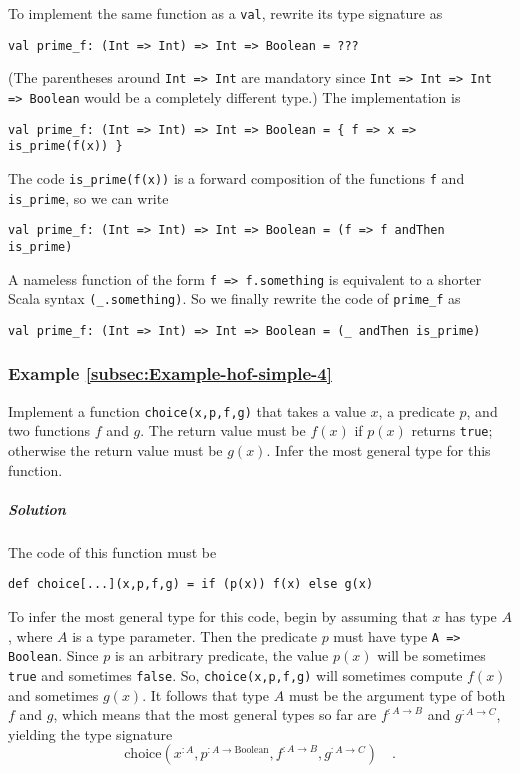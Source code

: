 To implement the same function as a \lstinline!val!, rewrite its
type signature as
\begin{lstlisting}
val prime_f: (Int => Int) => Int => Boolean = ???
\end{lstlisting}
(The parentheses around \lstinline!Int => Int! are mandatory since
\lstinline!Int => Int => Int => Boolean! would be a completely different
type.) The implementation is
\begin{lstlisting}
val prime_f: (Int => Int) => Int => Boolean = { f => x => is_prime(f(x)) }
\end{lstlisting}
The code \lstinline!is_prime(f(x))! is a forward composition of the
functions \lstinline!f! and \lstinline!is_prime!, so we can write
\begin{lstlisting}
val prime_f: (Int => Int) => Int => Boolean = (f => f andThen is_prime)
\end{lstlisting}
A nameless function of the form \lstinline!f => f.something! is equivalent
to a shorter Scala syntax \lstinline!(_.something)!. So we finally
rewrite the code of \lstinline!prime_f! as
\begin{lstlisting}
val prime_f: (Int => Int) => Int => Boolean = (_ andThen is_prime)
\end{lstlisting}


\subsubsection{Example \label{subsec:Example-hof-simple-4}\ref{subsec:Example-hof-simple-4}}

Implement a function \lstinline!choice(x,p,f,g)! that takes a value
$x$, a predicate $p$, and two functions $f$ and $g$. The return
value must be $f(x)$ if $p(x)$ returns \lstinline!true!; otherwise
the return value must be $g(x)$. Infer the most general type for
this function.

\subparagraph{Solution}

The code of this function must be
\begin{lstlisting}
def choice[...](x,p,f,g) = if (p(x)) f(x) else g(x)
\end{lstlisting}
To infer the most general type for this code, begin by assuming that
$x$ has type $A$, where $A$ is a type parameter. Then the predicate
$p$ must have type \lstinline!A => Boolean!. Since $p$ is an arbitrary
predicate, the value $p(x)$ will be sometimes \lstinline!true! and
sometimes \lstinline!false!. So, \lstinline!choice(x,p,f,g)! will
sometimes compute $f(x)$ and sometimes $g(x)$. It follows that type
$A$ must be the argument type of both $f$ and $g$, which means
that the most general types so far are $f^{:A\rightarrow B}$ and
$g^{:A\rightarrow C}$, yielding the type signature
\[
\text{choice}(x^{:A},p^{:A\rightarrow\text{Boolean}},f^{:A\rightarrow B},g^{:A\rightarrow C})\quad.
\]

